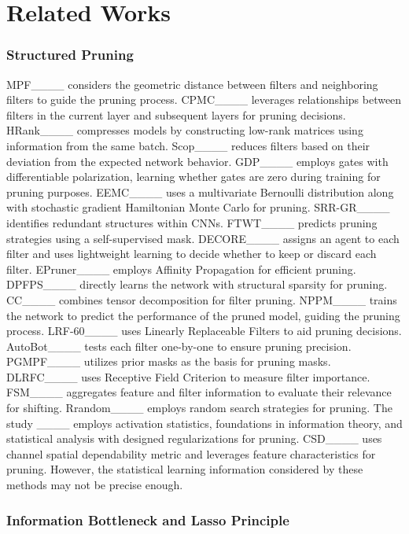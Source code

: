 \section{Related Works}
\subsubsection{Structured Pruning}
\label{sec:structured}
MPF____ considers the geometric distance between filters and neighboring filters to guide the pruning process. CPMC____ leverages relationships between filters in the current layer and subsequent layers for pruning decisions. HRank____ compresses models by constructing low-rank matrices using information from the same batch. Scop____ reduces filters based on their deviation from the expected network behavior. 
GDP____ employs gates with differentiable polarization, learning whether gates are zero during training for pruning purposes. EEMC____ uses a multivariate Bernoulli distribution along with stochastic gradient Hamiltonian Monte Carlo for pruning. SRR-GR____ identifies redundant structures within CNNs. FTWT____ predicts pruning strategies using a self-supervised mask. DECORE____ assigns an agent to each filter and uses lightweight learning to decide whether to keep or discard each filter. EPruner____ employs Affinity Propagation for efficient pruning. DPFPS____ directly learns the network with structural sparsity for pruning. CC____ combines tensor decomposition for filter pruning. NPPM____ trains the network to predict the performance of the pruned model, guiding the pruning process. LRF-60____ uses Linearly Replaceable Filters to aid pruning decisions. AutoBot____ tests each filter one-by-one to ensure pruning precision. 
PGMPF____ utilizes prior masks as the basis for pruning masks. DLRFC____ uses Receptive Field Criterion to measure filter importance. FSM____ aggregates feature and filter information to evaluate their relevance for shifting. Rrandom____ employs random search strategies for pruning.  The study ____ employs activation statistics, foundations in information theory, and statistical analysis with designed regularizations for pruning. CSD____ uses channel spatial dependability metric and leverages feature characteristics for pruning. However, the statistical learning information considered by these methods may not be precise enough.



\subsubsection{Information Bottleneck and Lasso Principle}

